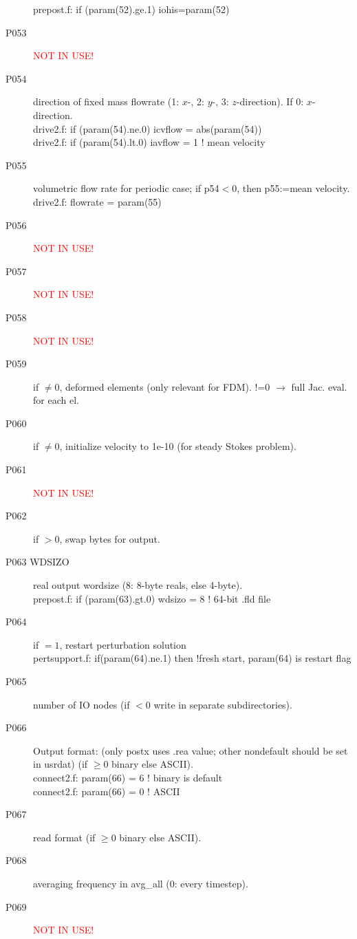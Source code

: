 \begin{description}
prepost.f:      if (param(52).ge.1) iohis=param(52)
\item [P053  ] {\textcolor{red}{ NOT IN USE!}}
\item [P054  ] direction of fixed mass flowrate (1: $x$-, 2: $y$-, 3: $z$-direction). If 0: $x$-direction.\\
drive2.f:      if (param(54).ne.0) icvflow = abs(param(54))\\
drive2.f:      if (param(54).lt.0) iavflow = 1 ! mean velocity
\item [P055  ] volumetric flow rate for periodic case;  if p54$<0$, then p55:=mean velocity.\\
drive2.f:      flowrate = param(55)
\item [P056  ] {\textcolor{red}{ NOT IN USE!}}
\item [P057  ] {\textcolor{red}{ NOT IN USE!}}
\item [P058  ] {\textcolor{red}{ NOT IN USE!}}
\item [P059  ] if $\neq0$, deformed elements (only relevant for FDM). !=0 $\rightarrow$ full Jac. eval. for each el.
\item [P060  ] if $\neq0$, initialize velocity to 1e-10 (for steady Stokes problem).
\item [P061  ] {\textcolor{red}{ NOT IN USE!}}
\item [P062  ] if $>0$, swap bytes for output.
\item [P063  WDSIZO] real output wordsize (8: 8-byte reals, else 4-byte).\\
prepost.f:      if (param(63).gt.0) wdsizo = 8         ! 64-bit .fld file
\item [P064  ] if $=1$, restart perturbation solution\\
pertsupport.f:      if(param(64).ne.1) then !fresh start, param(64) is restart flag
\item [P065  ] number of I\/O nodes (if $< 0$ write in separate subdirectories).
\item [P066  ] Output format: (only postx uses .rea value; other nondefault should be set in usrdat) (if $\geq 0$ binary else ASCII).\\
connect2.f:         param(66) = 6        ! binary is default\\
connect2.f:         param(66) = 0        ! ASCII
\item [P067  ] read format (if $\geq 0$ binary else ASCII).
\item [P068  ] averaging frequency in avg\_all (0: every timestep).
\item [P069  ] {\textcolor{red}{ NOT IN USE!}}

\end{description}
